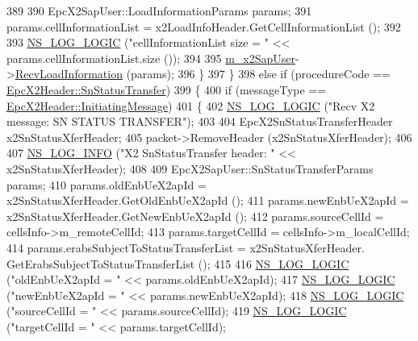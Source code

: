\begin{DoxyCode}
389 
390           EpcX2SapUser::LoadInformationParams params;
391           params.cellInformationList = x2LoadInfoHeader.GetCellInformationList ();
392 
393           \hyperlink{group__logging_ga88acd260151caf2db9c0fc84997f45ce}{NS\_LOG\_LOGIC} (\textcolor{stringliteral}{"cellInformationList size = "} << params.cellInformationList.size ());
394 
395           \hyperlink{classns3_1_1EpcX2_a0a74a3c19067fe18af3021c7b4c24c19}{m\_x2SapUser}->\hyperlink{classns3_1_1EpcX2SapUser_a3f780370974059b6ec3d115f5b1757d8}{RecvLoadInformation} (params);
396         \}
397     \}
398   \textcolor{keywordflow}{else} \textcolor{keywordflow}{if} (procedureCode == \hyperlink{classns3_1_1EpcX2Header_afd178c1ed3c47948c587955698a15b0da61f2f7393e096b85367e74db07851ae4}{EpcX2Header::SnStatusTransfer})
399     \{
400       \textcolor{keywordflow}{if} (messageType == \hyperlink{classns3_1_1EpcX2Header_a0e69b043a20eaee4c570f223f4eca715a5761e50c3c1918a44e3a5ebc86f17435}{EpcX2Header::InitiatingMessage})
401         \{
402           \hyperlink{group__logging_ga88acd260151caf2db9c0fc84997f45ce}{NS\_LOG\_LOGIC} (\textcolor{stringliteral}{"Recv X2 message: SN STATUS TRANSFER"});
403 
404             EpcX2SnStatusTransferHeader x2SnStatusXferHeader;
405             packet->RemoveHeader (x2SnStatusXferHeader);
406 
407             \hyperlink{group__logging_gafbd73ee2cf9f26b319f49086d8e860fb}{NS\_LOG\_INFO} (\textcolor{stringliteral}{"X2 SnStatusTransfer header: "} << x2SnStatusXferHeader);
408 
409             EpcX2SapUser::SnStatusTransferParams params;
410             params.oldEnbUeX2apId = x2SnStatusXferHeader.GetOldEnbUeX2apId ();
411             params.newEnbUeX2apId = x2SnStatusXferHeader.GetNewEnbUeX2apId ();
412             params.sourceCellId   = cellsInfo->m\_remoteCellId;
413             params.targetCellId   = cellsInfo->m\_localCellId;
414             params.erabsSubjectToStatusTransferList = x2SnStatusXferHeader.
      GetErabsSubjectToStatusTransferList ();
415 
416             \hyperlink{group__logging_ga88acd260151caf2db9c0fc84997f45ce}{NS\_LOG\_LOGIC} (\textcolor{stringliteral}{"oldEnbUeX2apId = "} << params.oldEnbUeX2apId);
417             \hyperlink{group__logging_ga88acd260151caf2db9c0fc84997f45ce}{NS\_LOG\_LOGIC} (\textcolor{stringliteral}{"newEnbUeX2apId = "} << params.newEnbUeX2apId);
418             \hyperlink{group__logging_ga88acd260151caf2db9c0fc84997f45ce}{NS\_LOG\_LOGIC} (\textcolor{stringliteral}{"sourceCellId = "} << params.sourceCellId);
419             \hyperlink{group__logging_ga88acd260151caf2db9c0fc84997f45ce}{NS\_LOG\_LOGIC} (\textcolor{stringliteral}{"targetCellId = "} << params.targetCellId);

\end{DoxyCode}
